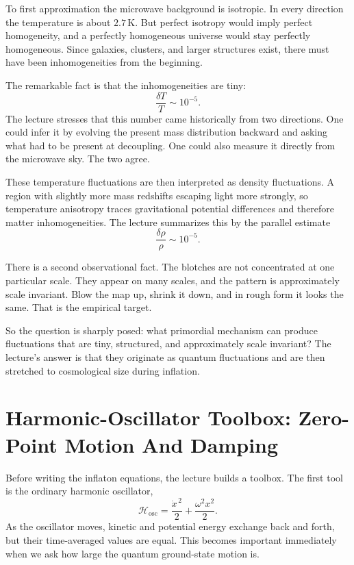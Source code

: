 To first approximation the microwave background is isotropic. In every direction the temperature is about \(2.7\,\mathrm{K}\). But perfect isotropy would imply perfect homogeneity, and a perfectly homogeneous universe would stay perfectly homogeneous. Since galaxies, clusters, and larger structures exist, there must have been inhomogeneities from the beginning.

The remarkable fact is that the inhomogeneities are tiny:
\begin{equation}
\frac{\delta T}{T}\sim 10^{-5}.
\end{equation}
The lecture stresses that this number came historically from two directions. One could infer it by evolving the present mass distribution backward and asking what had to be present at decoupling. One could also measure it directly from the microwave sky. The two agree.

These temperature fluctuations are then interpreted as density fluctuations. A region with slightly more mass redshifts escaping light more strongly, so temperature anisotropy traces gravitational potential differences and therefore matter inhomogeneities. The lecture summarizes this by the parallel estimate
\begin{equation}
\frac{\delta \rho}{\rho}\sim 10^{-5}.
\end{equation}

There is a second observational fact. The blotches are not concentrated at one particular scale. They appear on many scales, and the pattern is approximately scale invariant. Blow the map up, shrink it down, and in rough form it looks the same. That is the empirical target.

So the question is sharply posed: what primordial mechanism can produce fluctuations that are tiny, structured, and approximately scale invariant? The lecture's answer is that they originate as quantum fluctuations and are then stretched to cosmological size during inflation.

\section{Harmonic-Oscillator Toolbox: Zero-Point Motion And Damping}

Before writing the inflaton equations, the lecture builds a toolbox. The first tool is the ordinary harmonic oscillator,
\begin{equation}
\mathcal{H}_{\mathrm{osc}}=\frac{\dot x^{\,2}}{2}+\frac{\omega^{2}x^{2}}{2}.
\end{equation}
As the oscillator moves, kinetic and potential energy exchange back and forth, but their time-averaged values are equal. This becomes important immediately when we ask how large the quantum ground-state motion is.

